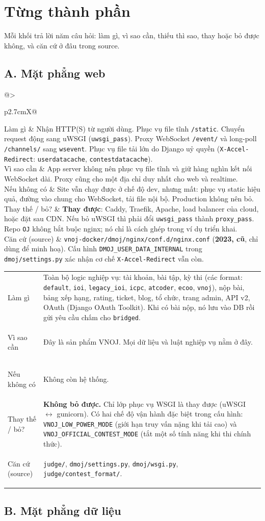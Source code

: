 \documentclass[11pt,a4paper]{article}
\makeatletter
\renewcommand{\c}[1]{\texttt{#1}}
\newcommand{\comp}[6]{%
\begin{tcolorbox}[enhanced,breakable,colback=white,colframe=black!55,boxrule=0.5pt,arc=2pt,
  title={\textbf{#1}},fonttitle=\large,left=4pt,right=4pt,top=3pt,bottom=3pt]
\begin{tabularx}{\linewidth}{@{}>{\bfseries\raggedright}p{2.7cm}X@{}}
Làm gì & #2 \\[2pt]
Vì sao cần & #3 \\[2pt]
Nếu không có & #4 \\[2pt]
Thay thế / bỏ? & #5 \\[2pt]
Căn cứ (source) & \small #6 \\
\end{tabularx}
\end{tcolorbox}}
\makeatother
\begin{document}
\section{Từng thành phần}
Mỗi khối trả lời năm câu hỏi: làm gì, vì sao cần, thiếu thì sao, thay hoặc bỏ được không, và căn cứ ở đâu trong source.

\subsection*{A. Mặt phẳng web}

\comp{A1. Reverse proxy (nginx)}
{Nhận HTTP(S) từ người dùng. Phục vụ file tĩnh \c{/static}. Chuyển request động sang uWSGI (\c{uwsgi\_pass}). Proxy WebSocket \c{/event/} và long-poll \c{/channels/} sang \c{wsevent}. Phục vụ file tải lớn do Django uỷ quyền (\c{X-Accel-Redirect}: \c{userdatacache}, \c{contestdatacache}).}
{App server không nên phục vụ file tĩnh và giữ hàng nghìn kết nối WebSocket dài. Proxy cũng cho một địa chỉ duy nhất cho web và realtime.}
{Site vẫn chạy được ở chế độ dev, nhưng mất: phục vụ static hiệu quả, đường vào chung cho WebSocket, tải file nội bộ. Production không nên bỏ.}
{\textbf{Thay được}: Caddy, Traefik, Apache, load balancer của cloud, hoặc đặt sau CDN. Nếu bỏ uWSGI thì phải đổi \c{uwsgi\_pass} thành \c{proxy\_pass}. Repo \c{OJ} không bắt buộc nginx; nó chỉ là cách ghép trong ví dụ triển khai.}
{\c{vnoj-docker/dmoj/nginx/conf.d/nginx.conf} (\textbf{2023, cũ}, chỉ dùng để minh hoạ). Cấu hình \c{DMOJ\_USER\_DATA\_INTERNAL} trong \c{dmoj/settings.py} xác nhận cơ chế \c{X-Accel-Redirect} vẫn còn.}

\comp{A2. Django site (uWSGI + app \c{judge})}
{Toàn bộ logic nghiệp vụ: tài khoản, bài tập, kỳ thi (các format: \c{default}, \c{ioi}, \c{legacy\_ioi}, \c{icpc}, \c{atcoder}, \c{ecoo}, \c{vnoj}), nộp bài, bảng xếp hạng, rating, ticket, blog, tổ chức, trang admin, API v2, OAuth (Django OAuth Toolkit). Khi có bài nộp, nó lưu vào DB rồi gửi yêu cầu chấm cho \c{bridged}.}
{Đây là sản phẩm VNOJ. Mọi dữ liệu và luật nghiệp vụ nằm ở đây.}
{Không còn hệ thống.}
{\textbf{Không bỏ được.} Chỉ lớp phục vụ WSGI là thay được (uWSGI $\leftrightarrow$ gunicorn). Có hai chế độ vận hành đặc biệt trong cấu hình: \c{VNOJ\_LOW\_POWER\_MODE} (giới hạn truy vấn nặng khi tải cao) và \c{VNOJ\_OFFICIAL\_CONTEST\_MODE} (tắt một số tính năng khi thi chính thức).}
{\c{judge/}, \c{dmoj/settings.py}, \c{dmoj/wsgi.py}, \c{judge/contest\_format/}.}

\subsection*{B. Mặt phẳng dữ liệu}
\end{document}
